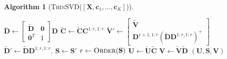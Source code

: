 \documentclass[11pt,a4paper]{article}
\theoremstyle{mybreak}
\newtheorem{algorithm}{Algorithm}
\numberwithin{dummy}{section}
\theoremstyle{plain}
\theoremstyle{plain}
\theoremstyle{plain}
\theoremstyle{plain}
\theoremstyle{MyNonumberplain}
\newcommand{\0}{\M{0}}
\newcommand{\M}[1]{\mathbf{#1}}
\newcommand{\Mt}[1]{\tilde{\M{#1}}}
\newcommand{\ve}[1]{\mathbf{#1}}
\begin{document}
\begin{algorithm}[\textnormal{\textsc{ThinSVD}($[\M{X}, \ve{c}_1, \dots, \ve{c}_K]$)}]
\begin{algorithmic}[1]
    \State
    \begin{math}
      \Mt{D}
      \gets
      \begin{bmatrix}
        \Mt{D} & \0
        \\
        \0^T & 1
      \end{bmatrix}
      \M{D}
    \end{math}
    \Else
    \State
    \begin{math}
      \Mt{C}
      \gets
      \Mt{C}  \M{C}^{1:r, 1:r}
    \end{math}
    \State
    \begin{math}
      \Mt{V}'
      \gets
      \begin{bmatrix}
        \Mt{V}
        \\
        \M{D}^{r+1, 1:r} \left(\Mt{D} \M{D}^{1:r,1:r} \right)^+
      \end{bmatrix}
    \end{math}
    \State
    \begin{math}
      \Mt{D}'
      \gets
      \Mt{D} \M{D}^{1:r, 1:r}.
    \end{math}
    \EndIf
    \State
    \begin{math}
      \M{S} \gets \M{S}'
    \end{math}
    \State
    \begin{math}
      r \gets \textsc{Order}(\M{S})
    \end{math}
    \EndFor
    \State
    \begin{math}
      \M{U} \gets \Mt{U} \Mt{C}
    \end{math}
    \State
    \begin{math}
      \M{V} \gets \Mt{V} \Mt{D}
    \end{math}
    \State
    \Return $(\M{U}, \M{S}, \M{V})$
  \end{algorithmic}
\end{algorithm}


\end{document}
